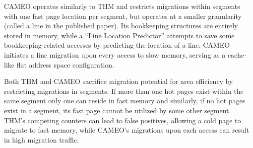 CAMEO \cite{cameo} operates similarly to THM and restricts migrations within segments with one fast page location per segment, but operates at a smaller granularity (called a line in the published paper). Its bookkeeping structures are entirely stored in memory, while a ``Line Location Predictor'' attempts to save some bookkeeping-related accesses by predicting the location of a line. CAMEO initiates a line migration upon every access to slow memory, serving as a cache-like flat address space configuration.

Both THM and CAMEO sacrifice migration potential for area efficiency by restricting migrations in segments. If more than one hot pages exist within the same segment only one can reside in fast memory and similarly, if no hot pages exist in a segment, its fast page cannot be utilized by some other segment. THM's competing counters can lead to false positives, allowing a cold page to migrate to fast memory, while CAMEO's migrations upon each access can result in high migration traffic.